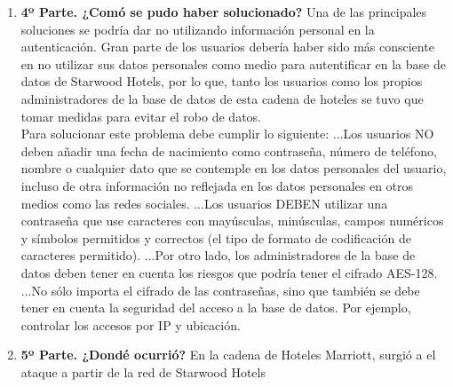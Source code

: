 \documentclass{article}
\begin{document}
\begin{enumerate}[label=\alph*]
    \item \textbf{4º Parte. ¿Comó se pudo haber solucionado?}
        Una de las principales soluciones se podría dar no utilizando información personal en la autenticación. Gran parte de los usuarios debería haber sido más consciente en no utilizar sus datos personales como medio para autentificar en la base de datos de Starwood Hotels, por lo que, tanto los usuarios como los propios administradores de la base de datos de esta cadena de hoteles se tuvo que tomar medidas para evitar el robo de datos. \\
Para solucionar este problema debe cumplir lo siguiente:
...Los usuarios NO deben añadir una fecha de nacimiento como contraseña, número de teléfono, nombre o cualquier dato que se contemple en los datos personales del usuario, incluso de otra información no reflejada en los datos personales en otros medios como las redes sociales.
...Los usuarios DEBEN utilizar una contraseña que use caracteres con mayúsculas, minúsculas, campos numéricos y símbolos permitidos y correctos (el tipo de formato de codificación de caracteres permitido).
...Por otro lado, los administradores de la base de datos deben tener en cuenta los riesgos que podría tener el cifrado AES-128.
...No sólo importa el cifrado de las contraseñas, sino que también se debe tener en cuenta la seguridad del acceso a la base de datos. Por ejemplo, controlar los accesos por IP y ubicación.

    \item \textbf{5º Parte. ¿Dondé ocurrió?}
    En la cadena de Hoteles Marriott, surgió a el ataque a partir de la red de Starwood Hotels
\end{enumerate}
\end{document}
